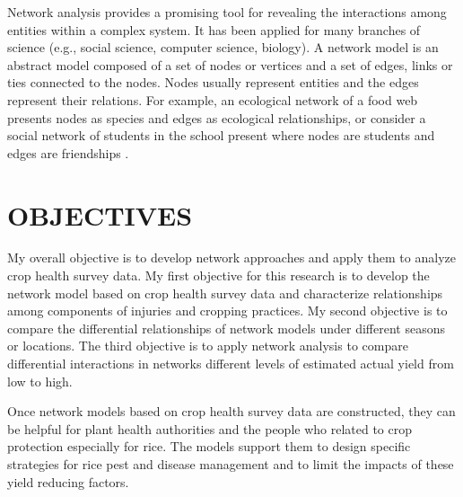 Network analysis provides a promising tool for revealing the interactions among entities within a complex system. It has been applied for many branches of science (e.g., social science, computer science, biology). A network model is an abstract model composed of a set of nodes or vertices and a set of edges, links or ties connected to the nodes. Nodes usually represent entities and the edges represent their relations. For example, an ecological network of a food web presents nodes as species  and edges as ecological relationships, or consider a social network of students in the school present where nodes are students and edges are friendships .

\section*{OBJECTIVES}


My overall objective is to develop network approaches and apply them to analyze crop health survey data. My first objective for this research is to develop the network model based on crop health survey data and characterize relationships among components of injuries and cropping practices. My second objective is to compare the differential relationships of network models under different seasons or locations. The third objective is to apply network analysis to compare differential interactions in networks   different levels of estimated actual yield from low to high.


Once network models based on crop health survey data are constructed, they can be helpful for plant health authorities and the people who related to crop protection especially for rice. The models support them to design specific strategies for rice pest and disease management and to limit the impacts of these yield reducing factors.  

